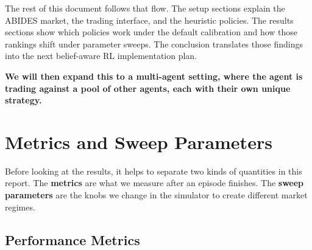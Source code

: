 \documentclass[11pt]{article}
\begin{document}
The rest of this document follows that flow. The setup sections explain the
ABIDES market, the trading interface, and the heuristic policies. The results
sections show which policies work under the default calibration and how those
rankings shift under parameter sweeps. The conclusion translates those findings
into the next belief-aware RL implementation plan.

\textbf{We will then expand this to a multi-agent setting, where the agent is trading against a pool of other agents, each with their own unique strategy.}

\section{Metrics and Sweep Parameters}

Before looking at the results, it helps to separate two kinds of quantities in
this report. The \textbf{metrics} are what we measure after an episode finishes.
The \textbf{sweep parameters} are the knobs we change in the simulator to create
different market regimes.

\subsection{Performance Metrics}
\end{document}
